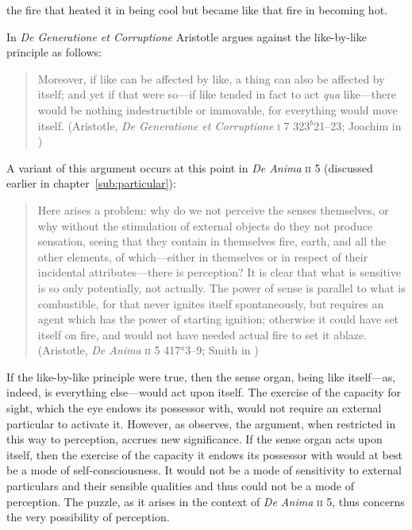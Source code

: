 the fire that heated it in being cool but became like that fire in becoming hot. 

In \emph{De Generatione et Corruptione} Aristotle argues against the like-by-like principle as follows:
\begin{quote}
	Moreover, if like can be affected by like, a thing can also be affected by itself; and yet if that were so---if like tended in fact to act \emph{qua} like---there would be nothing indestructible or immovable, for everything would move itself. (Aristotle, \emph{De Generatione et Corruptione} \textsc{i} 7 323\( ^{b} \)21--23; Joachim in \citealt[23]{Barnes:1984uq})
\end{quote}
A variant of this argument occurs at this point in \emph{De Anima} \textsc{ii} 5 (discussed earlier in chapter~\ref{sub:particular}):
\begin{quote}
	Here arises a problem: why do we not perceive the senses themselves, or why without the stimulation of external objects do they not produce sensation, seeing that they contain in themselves fire, earth, and all the other elements, of which---either in themselves or in respect of their incidental attributes---there is perception? It is clear that what is sensitive is so only potentially, not actually. The power of sense is parallel to what is combustible, for that never ignites itself spontaneously, but requires an agent which has the power of starting ignition; otherwise it could have set itself on fire, and would not have needed actual fire to set it ablaze. (Aristotle, \emph{De Anima} \textsc{ii} 5 417\( ^{a} \)3--9; Smith in \citealt[29]{Barnes:1984uq})
\end{quote}
If the like-by-like principle were true, then the sense organ, being like itself---as, indeed, is everything else---would act upon itself. The exercise of the capacity for sight, which the eye endows its possessor with, would not require an external particular to activate it. However, as \citet[226--227]{Polansky:2007ly} observes, the argument, when restricted in this way to perception, accrues new significance. If the sense organ acts upon itself, then the exercise of the capacity it endows its possessor with would at best be a mode of self-consciousness. It would not be a mode of sensitivity to external particulars and their sensible qualities and thus could not be a mode of perception. The puzzle, as it arises in the context of \emph{De Anima} \textsc{ii} 5, thus concerns the very possibility of perception.

